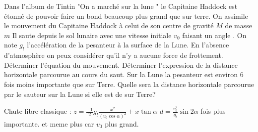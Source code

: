 \begin{Exercise}[title=Bond sur la Lune]
	Dans l'album de Tintin "On a marché sur la lune " le Capitaine Haddock est étonné de pouvoir faire un bond beaucoup plus grand que sur terre.
	On assimile le mouvement du Capitaine Haddock à celui de son centre de gravité $M$ de masse $m$ Il saute depuis le sol lunaire avec une vitesse initiale $v_0$ faisant un angle . On note $g_l$ l'accélération de la pesanteur à la surface de la Lune. En l'absence d'atmosphère on peux considérer qu'il n'y a aucune force de frottement.
	\Question Déterminer l'équation du mouvement.
	\Question Déterminer l'expression de la distance horizontale parcourue au cours du saut.
	\Question Sur la Lune la pesanteur est environ 6 fois moins importante que sur Terre. Quelle sera la distance horizontale parcourue par le sauteur sur la Lune si elle est de  sur Terre?
\end{Exercise}
\begin{Answer}
	\Question Chute libre classique : $z= \frac{-1}{2}g_l\frac{x^2}{(v_0\cos \alpha)^2}+x\tan\alpha$
	\Question $d=\frac{v_0^2}{g_l}\sin 2\alpha$
	 fois plus importante. et meme plus car $v_0$ plus grand.
\end{Answer}
